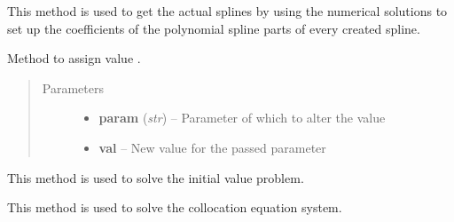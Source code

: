\documentclass[letterpaper,10pt,english]{sphinxmanual}
\begin{document}
\begin{fulllineitems}
\begin{fulllineitems}
This method is used to get the actual splines by using the numerical
solutions to set up the coefficients of the polynomial spline parts of
every created spline.

\end{fulllineitems}


\begin{fulllineitems}
\label{pytrajectory:pytrajectory.trajectory.Trajectory.setParam}
Method to assign value .
\begin{quote}\begin{description}
\item[{Parameters}] \leavevmode\begin{itemize}
\item {} 
\textbf{param} (\emph{str}) -- Parameter of which to alter the value

\item {} 
\textbf{val} -- New value for the passed parameter

\end{itemize}

\end{description}\end{quote}

\end{fulllineitems}


\begin{fulllineitems}
\label{pytrajectory:pytrajectory.trajectory.Trajectory.simulate}
This method is used to solve the initial value problem.

\end{fulllineitems}


\begin{fulllineitems}
\label{pytrajectory:pytrajectory.trajectory.Trajectory.solve}
This method is used to solve the collocation equation system.

\end{fulllineitems}



\end{fulllineitems}
\end{document}
